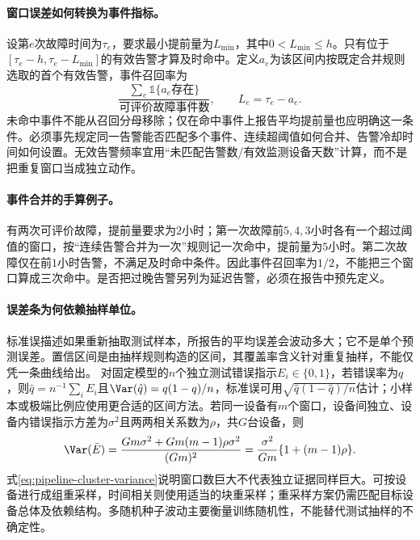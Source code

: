 \paragraph{窗口误差如何转换为事件指标。}
设第$e$次故障时间为$\tau_e$，要求最小提前量为$L_{\min}$，其中$0<L_{\min}\leq h$。只有位于$[\tau_e-h,\tau_e-L_{\min}]$的有效告警才算及时命中。定义$a_e$为该区间内按既定合并规则选取的首个有效告警，事件召回率为
\begin{equation}
 \frac{\sum_e\mathbb1\{a_e\text{存在}\}}{\text{可评价故障事件数}},\qquad
 L_e=\tau_e-a_e.
\end{equation}
未命中事件不能从召回分母移除；仅在命中事件上报告平均提前量也应明确这一条件。必须事先规定同一告警能否匹配多个事件、连续超阈值如何合并、告警冷却时间如何设置。无效告警频率宜用“未匹配告警数/有效监测设备天数”计算，而不是把重复窗口当成独立动作。

\paragraph{事件合并的手算例子。}
有两次可评价故障，提前量要求为$2$小时；第一次故障前$5,4,3$小时各有一个超过阈值的窗口，按“连续告警合并为一次”规则记一次命中，提前量为$5$小时。第二次故障仅在前$1$小时告警，不满足及时命中条件。因此事件召回率为$1/2$，不能把三个窗口算成三次命中。是否把过晚告警另列为延迟告警，必须在报告中预先定义。

\paragraph{误差条为何依赖抽样单位。}
标准误描述如果重新抽取测试样本，所报告的平均误差会波动多大；它不是单个预测误差。置信区间是由抽样规则构造的区间，其覆盖率含义针对重复抽样，不能仅凭一条曲线给出。
对固定模型的$n$个独立测试错误指示$E_i\in\{0,1\}$，若错误率为$q$，则$\hat q=n^{-1}\sum_iE_i$且$\Var(\hat q)=q(1-q)/n$，标准误可用$\sqrt{\hat q(1-\hat q)/n}$估计；小样本或极端比例应使用更合适的区间方法。若同一设备有$m$个窗口，设备间独立、设备内错误指示方差为$\sigma^2$且两两相关系数为$\rho$，共$G$台设备，则
\begin{equation}
 \Var(\bar E)=\frac{Gm\sigma^2+Gm(m-1)\rho\sigma^2}{(Gm)^2}
 =\frac{\sigma^2}{Gm}\{1+(m-1)\rho\}.\label{eq:pipeline-cluster-variance}
\end{equation}
式\eqref{eq:pipeline-cluster-variance}说明窗口数巨大不代表独立证据同样巨大。可按设备进行成组重采样，时间相关则使用适当的块重采样；重采样方案仍需匹配目标设备总体及依赖结构。多随机种子波动主要衡量训练随机性，不能替代测试抽样的不确定性。

